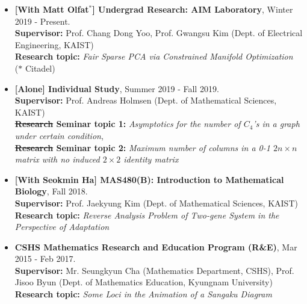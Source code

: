 \documentclass[10pt,a4]{article}
\begin{document}
\begin{small}
\begin{itemize}
 \item {\bf [With Matt Olfat$^{*}$] Undergrad Research:
  AIM Laboratory}, Winter 2019 - Present. \\
 {\bf Supervisor:} Prof. Chang Dong Yoo, Prof. Gwangsu Kim (Dept. of Electrical Engineering, KAIST) \\
 {\bf Research topic:} {\it Fair Sparse PCA via Constrained Manifold Optimization} \\
 ($*$ Citadel)\\

 \item {\bf [Alone] Individual Study}, Summer 2019 - Fall 2019. \\
 {\bf Supervisor:} Prof. Andreas Holmsen (Dept. of Mathematical Sciences, KAIST) \\
 {\bf \st{Research} Seminar topic 1:} {\it Asymptotics for the number of $C_4$'s in a graph under certain condition}, \\
 {\bf \st{Research} Seminar topic 2:} {\it Maximum number of columns in a 0-1 $2n \times n$ matrix with no induced $2 \times 2$ identity matrix} \\


 \item {\bf [With Seokmin Ha] MAS480(B): Introduction to Mathematical Biology}, Fall 2018. \\
 {\bf Supervisor:} Prof. Jaekyung Kim (Dept. of Mathematical Sciences, KAIST) \\
 {\bf Research topic:} {\it Reverse Analysis Problem of Two-gene System in the
Perspective of Adaptation} \\

\item {\bf CSHS Mathematics Research and Education Program (R\&E)}, Mar 2015 - Feb 2017. \\
 {\bf Supervisor:} Mr. Seungkyun Cha (Mathematics Department, CSHS), Prof. Jisoo Byun (Dept. of Mathematics Education, Kyungnam University) \\
 {\bf Research topic:} {\it Some Loci in the Animation of a Sangaku Diagram} \\
 

\end{itemize}
\end{small}
\end{document}
